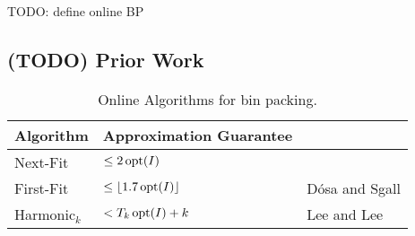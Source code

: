 TODO: define online BP

\subsection{(TODO) Prior Work}

\begin{table}[ht]
\centering
\caption{Online Algorithms for bin packing.}
\begin{tabular}{|l|l|l|}
\hline Algorithm & Approximation Guarantee &
\\ \hline Next-Fit & $\le 2\operatorname{opt}(I)$ &
\\ \hline First-Fit & $\le \left\lfloor 1.7\operatorname{opt}(I) \right\rfloor$ & D\'osa and Sgall \cite{dosa2013first}
\\ \hline Harmonic$_k$ & $< T_k\operatorname{opt}(I) + k$ & Lee and Lee \cite{leelee}
\\ \hline
\end{tabular}
\label{table:online-1bp}
\end{table}
